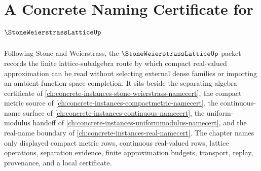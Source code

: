 \chapter{A Concrete Naming Certificate for $\StoneWeierstrassLatticeUp$}
\label{ch:concrete-instances-stone-weierstrass-lattice-namecert}

Following Stone and Weierstrass, the $\StoneWeierstrassLatticeUp$ packet records the finite lattice-subalgebra route by which compact real-valued approximation can be read without selecting external dense families or importing an ambient function-space completion. It sits beside the separating-algebra certificate of \autoref{ch:concrete-instances-stone-weierstrass-namecert}, the compact metric source of \autoref{ch:concrete-instances-compactmetric-namecert}, the continuous-name surface of \autoref{ch:concrete-instances-continuous-namecert}, the uniform-modulus handoff of \autoref{ch:concrete-instances-uniformmodulus-namecert}, and the real-name boundary of \autoref{ch:concrete-instances-real-namecert}. The chapter names only displayed compact metric rows, continuous real-valued rows, lattice operations, separation evidence, finite approximation budgets, transport, replay, provenance, and a local certificate.

